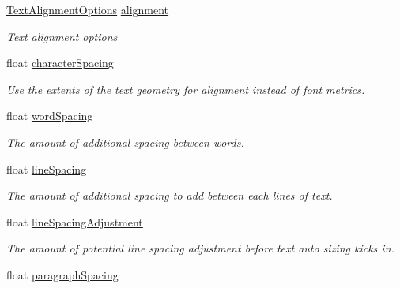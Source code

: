 \begin{DoxyCompactItemize}
\mbox{\hyperlink{namespace_t_m_pro_a1dd743b58b1fd4057c00e4b98ab86301}{Text\+Alignment\+Options}} \mbox{\hyperlink{class_t_m_pro_1_1_t_m_p___text_aca3d7496b6d7fc7792f6f560180a09c8}{alignment}}
\begin{DoxyCompactList}\small\item\em Text alignment options \end{DoxyCompactList}\item 
float \mbox{\hyperlink{class_t_m_pro_1_1_t_m_p___text_a4f58b974821506bd6443e8771306eaf1}{character\+Spacing}}
\begin{DoxyCompactList}\small\item\em Use the extents of the text geometry for alignment instead of font metrics. \end{DoxyCompactList}\item 
float \mbox{\hyperlink{class_t_m_pro_1_1_t_m_p___text_a89e9e5abbcf91abc49ba30c65a405456}{word\+Spacing}}
\begin{DoxyCompactList}\small\item\em The amount of additional spacing between words. \end{DoxyCompactList}\item 
float \mbox{\hyperlink{class_t_m_pro_1_1_t_m_p___text_a2b02e5ecbb2af2f3a2d3d76f5a23c13f}{line\+Spacing}}
\begin{DoxyCompactList}\small\item\em The amount of additional spacing to add between each lines of text. \end{DoxyCompactList}\item 
float \mbox{\hyperlink{class_t_m_pro_1_1_t_m_p___text_a966cc43dea3bed456624f8d85c29e70b}{line\+Spacing\+Adjustment}}
\begin{DoxyCompactList}\small\item\em The amount of potential line spacing adjustment before text auto sizing kicks in. \end{DoxyCompactList}\item 
float \mbox{\hyperlink{class_t_m_pro_1_1_t_m_p___text_a8f5d0190e904f648b43377a5d89b5de7}{paragraph\+Spacing}}

\end{DoxyCompactItemize}
